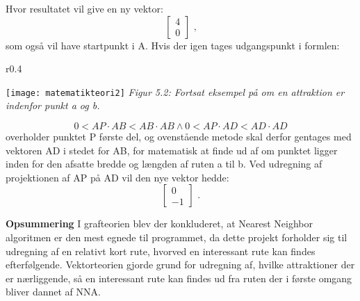 Hvor resultatet vil give en ny vektor: \[ \begin{bmatrix} 4 \\ 0 \end{bmatrix} \text{ ,} \]  som også vil have startpunkt i A. Hvis der igen tages udgangspunkt i formlen:\newline
\begin{wrapfigure}{r}{0.4\textwidth}
	\vspace{-20pt}
	\begin{center}
		\texttt{[image: matematikteori2]} \newline
		\textit{Figur 5.2: Fortsat eksempel på om en attraktion er indenfor punkt a og b.}\newline
	\end{center}
	\vspace{-20pt}
\end{wrapfigure}
\[0 < AP \cdot AB < AB \cdot AB \wedge 0 < AP \cdot AD < AD \cdot AD \]
overholder punktet P første del, og ovenstående metode skal derfor gentages med vektoren AD i stedet for AB, for matematisk at finde ud af om punktet ligger inden 	for den afsatte bredde og længden af ruten a til b. Ved udregning af projektionen af AP på AD vil den nye vektor hedde: \[ \begin{bmatrix} 0 \\ -1 \end{bmatrix} \text{ .} \]\newline

\textbf{Opsummering}\newline
I grafteorien blev der konkluderet, at Nearest Neighbor algoritmen er den mest egnede til programmet, da dette projekt forholder sig til udregning af en relativt kort rute, hvorved en interessant rute kan findes efterfølgende. Vektorteorien gjorde grund for udregning af, hvilke attraktioner der er nærliggende, så en interessant rute kan findes ud fra ruten der i første omgang bliver dannet af NNA.

